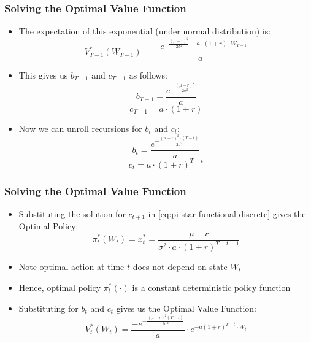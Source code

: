 \documentclass[handout]{beamer}
\begin{document}
\begin{frame}
\frametitle{Solving the Optimal Value Function}
\pause
\begin{itemize}[<+->]
\item The expectation of this exponential (under normal distribution) is:
$$V^*_{T-1}(W_{T-1}) = \frac {-e^{-\frac {(\mu - r)^2} {2 \sigma^2} - a \cdot (1 + r) \cdot W_{T-1}}} a$$
\item This gives us $b_{T-1}$ and $c_{T-1}$ as follows:
$$b_{T-1} = \frac {e^{- \frac {(\mu - r)^2} {2 \sigma^2}}} a$$
$$c_{T-1} = a \cdot (1 + r)$$
\item Now we can unroll recursions for $b_t$ and $c_t$:
$$b_t = \frac {e^{- \frac {(\mu - r)^2 \cdot (T-t)} {2 \sigma^2}}} a$$
$$ c_t = a \cdot (1+ r)^{T-t}$$
\end{itemize}
\end{frame}

\begin{frame}
\frametitle{Solving the Optimal Value Function}
\pause
\begin{itemize}[<+->]
\item Substituting the solution for $c_{t+1}$ in \eqref{eq:pi-star-functional-discrete} gives the Optimal Policy:
$$\pi^*_t(W_t) = x^*_t = \frac {\mu - r} {\sigma^2 \cdot a \cdot (1+ r)^{T-t-1}}$$
\item Note optimal action at time $t$ does not depend on state $W_t$
\item Hence, optimal policy $\pi^*_t(\cdot)$ is a constant deterministic policy function
\item Substituting for $b_t$ and $c_t$  gives us the Optimal Value Function:
$$V^*_t(W_t) = \frac {- e^{- \frac {(\mu - r)^2 (T-t)} {2 \sigma^2}}} a \cdot e^{- a (1+ r)^{T-t} \cdot W_t}$$
\end{itemize}
\end{frame}
\end{document}
